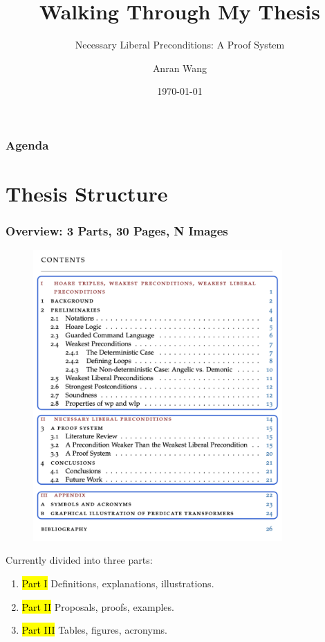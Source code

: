 \documentclass[aspectratio=169]{beamer}
\title{Walking Through My Thesis}
\subtitle{Necessary Liberal Preconditions: A Proof System}
\author{Anran Wang}
\institute{Department of Informatics\\ Technical University of Munich}
\date{\today}
\begin{document}
\begin{frame}
	\titlepage
\end{frame}

\begin{frame}
	\frametitle{Agenda}
	\tableofcontents
\end{frame}

\section{Thesis Structure}
\begin{frame}[fragile]
	\frametitle{Overview: 3 Parts, 30 Pages, N Images}
	\begin{minipage}{0.49\linewidth}	
		\begin{figure}
	    \centering\includegraphics[width=0.85\textwidth]{images/toc-split.png} 
	  \end{figure}
	\end{minipage}
\begin{minipage}{0.49\linewidth}
	Currently divided into three parts: 
		\begin{enumerate}
		    \item[] \hl{Part I} Definitions, explanations, illustrations. 
		    \item[] \hl{Part II} Proposals, proofs, examples. 
		    \item[] \hl{Part III} Tables, figures, acronyms. 
		\end{enumerate}
	\end{minipage}
\end{frame}
\end{document}
